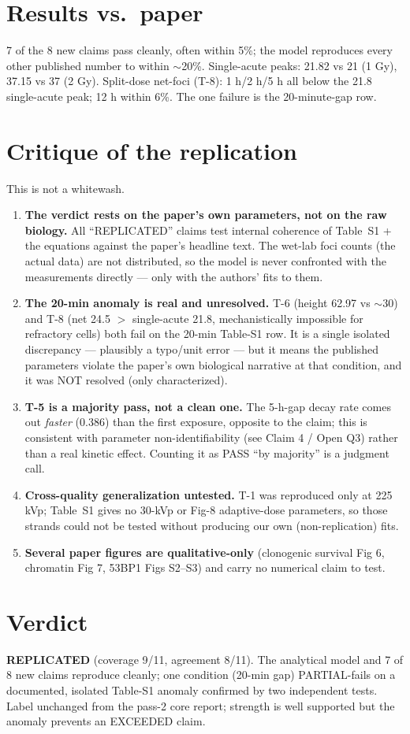 \documentclass[11pt]{article}
\begin{document}
\section{Results vs.\ paper}
7 of the 8 new claims pass cleanly, often within 5\%; the model reproduces every
other published number to within $\sim$20\%. Single-acute peaks: 21.82 vs 21
(1 Gy), 37.15 vs 37 (2 Gy). Split-dose net-foci (T-8): 1 h/2 h/5 h all below the
21.8 single-acute peak; 12 h within 6\%. The one failure is the 20-minute-gap row.

\section{Critique of the replication}
This is not a whitewash.
\begin{enumerate}
\item \textbf{The verdict rests on the paper's own parameters, not on the raw
biology.} All ``REPLICATED'' claims test internal coherence of Table~S1 + the
equations against the paper's headline text. The wet-lab foci counts (the actual
data) are not distributed, so the model is never confronted with the measurements
directly --- only with the authors' fits to them.
\item \textbf{The 20-min anomaly is real and unresolved.} T-6 (height 62.97 vs
$\sim$30) and T-8 (net 24.5 $>$ single-acute 21.8, mechanistically impossible for
refractory cells) both fail on the 20-min Table-S1 row. It is a single isolated
discrepancy --- plausibly a typo/unit error --- but it means the published
parameters violate the paper's own biological narrative at that condition, and it
was NOT resolved (only characterized).
\item \textbf{T-5 is a majority pass, not a clean one.} The 5-h-gap decay rate
comes out \emph{faster} (0.386) than the first exposure, opposite to the claim;
this is consistent with parameter non-identifiability (see Claim 4 / Open Q3)
rather than a real kinetic effect. Counting it as PASS ``by majority'' is a
judgment call.
\item \textbf{Cross-quality generalization untested.} T-1 was reproduced only at
225 kVp; Table~S1 gives no 30-kVp or Fig-8 adaptive-dose parameters, so those
strands could not be tested without producing our own (non-replication) fits.
\item \textbf{Several paper figures are qualitative-only} (clonogenic survival
Fig 6, chromatin Fig 7, 53BP1 Figs S2--S3) and carry no numerical claim to test.
\end{enumerate}

\section{Verdict}
\textbf{REPLICATED} (coverage 9/11, agreement 8/11). The analytical model and 7 of
8 new claims reproduce cleanly; one condition (20-min gap) PARTIAL-fails on a
documented, isolated Table-S1 anomaly confirmed by two independent tests. Label
unchanged from the pass-2 core report; strength is well supported but the anomaly
prevents an EXCEEDED claim.


\end{document}

